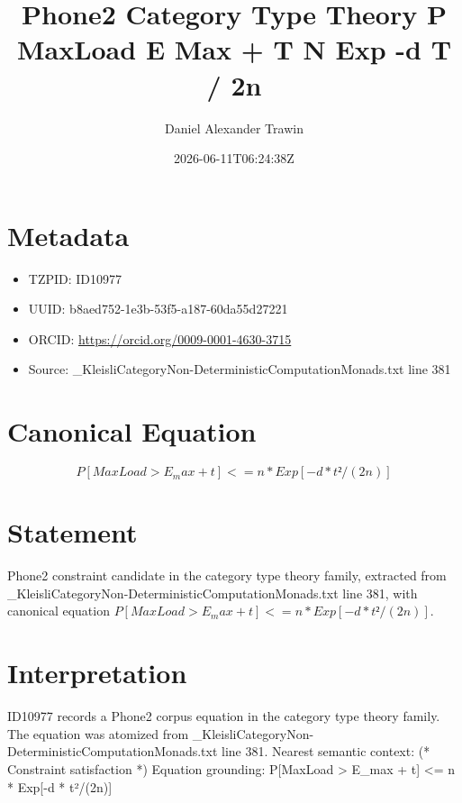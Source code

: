 \documentclass[11pt]{article}
\title{Phone2 Category Type Theory P MaxLoad E Max + T N Exp -d T / 2n}
\author{Daniel Alexander Trawin}
\date{2026-06-11T06:24:38Z}
\begin{document}
\maketitle
\section*{Metadata}
\begin{itemize}
\item TZPID: ID10977
\item UUID: b8aed752-1e3b-53f5-a187-60da55d27221
\item ORCID: \url{https://orcid.org/0009-0001-4630-3715}
\item Source: _KleisliCategoryNon-DeterministicComputationMonads.txt line 381
\end{itemize}
\section*{Canonical Equation}
\[
P[MaxLoad > E_max + t] <= n * Exp[-d * t²/(2n)]
\]
\section*{Statement}
Phone2 constraint candidate in the category type theory family, extracted from _KleisliCategoryNon-DeterministicComputationMonads.txt line 381, with canonical equation $P[MaxLoad > E_max + t] <= n * Exp[-d * t²/(2n)]$.
\section*{Interpretation}
ID10977 records a Phone2 corpus equation in the category type theory family. The equation was atomized from _KleisliCategoryNon-DeterministicComputationMonads.txt line 381. Nearest semantic context: (* Constraint satisfaction *) Equation grounding: P[MaxLoad > E_max + t] <= n * Exp[-d * t²/(2n)]
\end{document}
